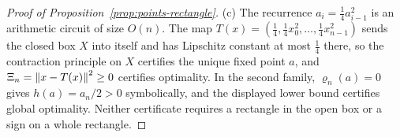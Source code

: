 \begin{proof}[Proof of Proposition~\ref{prop:points-rectangle}]
(c) The recurrence $a_i=\frac14a_{i-1}^2$ is an arithmetic circuit of size
$O(n)$. The map $T(x)=(\frac14,\frac14x_0^2,\ldots,\frac14x_{n-1}^2)$
sends the closed box $X$ into itself and has Lipschitz constant at most
$\frac14$ there, so the contraction principle on $X$ certifies the unique
fixed point $a$, and $\Xi_n=\left\lVert x-T(x)\right\rVert^2\ge0$ certifies optimality. In the
second family, $\varrho_n(a)=0$ gives $h(a)=a_n/2>0$ symbolically, and the
displayed lower bound certifies global optimality. Neither certificate
requires a rectangle in the open box or a sign on a whole rectangle.
\end{proof}
